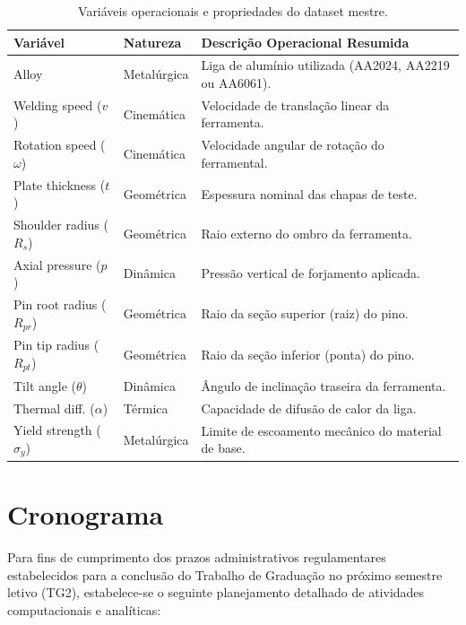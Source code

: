 \documentclass[12pt,openany]{report}
\begin{document}
\begin{table}[t!]
\centering
\caption{Variáveis operacionais e propriedades do dataset mestre.}
\label{tab:variaveis_enxuta}
\small
\begin{tabularx}{\textwidth}{l l X}
\toprule
\textbf{Variável} & \textbf{Natureza} & \textbf{Descrição Operacional Resumida} \\ \midrule
Alloy & Metalúrgica & Liga de alumínio utilizada (AA2024, AA2219 ou AA6061). \\
Welding speed ($v$) & Cinemática & Velocidade de translação linear da ferramenta. \\
Rotation speed ($\omega$) & Cinemática & Velocidade angular de rotação do ferramental. \\
Plate thickness ($t$) & Geométrica & Espessura nominal das chapas de teste. \\
Shoulder radius ($R_s$) & Geométrica & Raio externo do ombro da ferramenta. \\
Axial pressure ($p$) & Dinâmica & Pressão vertical de forjamento aplicada. \\
Pin root radius ($R_{pr}$) & Geométrica & Raio da seção superior (raiz) do pino. \\
Pin tip radius ($R_{pt}$) & Geométrica & Raio da seção inferior (ponta) do pino. \\
Tilt angle ($\theta$) & Dinâmica & Ângulo de inclinação traseira da ferramenta. \\
Thermal diff. ($\alpha$) & Térmica & Capacidade de difusão de calor da liga. \\
Yield strength ($\sigma_y$) & Metalúrgica & Limite de escoamento mecânico do material de base. \\ \bottomrule
\end{tabularx}
\end{table}

\chapter{Cronograma}

Para fins de cumprimento dos prazos administrativos regulamentares estabelecidos para a conclusão do Trabalho de Graduação no próximo semestre letivo (TG2), estabelece-se o seguinte planejamento detalhado de atividades computacionais e analíticas:
\end{document}

